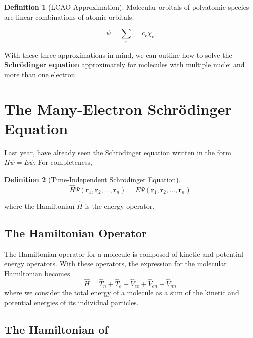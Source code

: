 \documentclass[a4paper]{tufte-handout}
\theoremstyle{definition}
\newtheorem{definition}{Definition}
\begin{document}
\begin{definition}[LCAO Approximation] 
  Molecular orbitals of polyatomic species are linear combinations of atomic orbitals.

  \begin{equation}
    \psi = \sum_{r} = c_{r} \chi_{r}
  \end{equation}

\end{definition}

With these three approximations in mind, we can outline how to solve the \textbf{Schrödinger equation}
approximately for molecules with multiple nuclei and more than one electron.

\section{The Many-Electron Schrödinger Equation}

Last year, have already seen the Schrödinger equation written in the form $H\psi = E\psi$. For completeness,

\begin{definition}[Time-Independent Schrödinger Equation] 

  \begin{equation}
    \hat{H} \Psi(\mathbf{r}_1, \mathbf{r}_2, \dots, \mathbf{r}_n) = E \Psi(\mathbf{r}_1, \mathbf{r}_2, \dots, \mathbf{r}_n)
  \end{equation}

  where the Hamiltonian $\hat{H}$ is the energy operator.

\end{definition}

\subsection{The Hamiltonian Operator}

The Hamiltonian operator for a molecule is composed of kinetic and potential energy operators. 
With these operators, the expression for the molecular Hamiltonian becomes 
$$\hat{H} = \hat{T}_{n} + \hat{T}_{e} + \hat{V}_{ee} + \hat{V}_{en} + \hat{V}_{nn}$$
where we consider the total energy of a molecule as a sum of the kinetic and potential energies of its individual particles.

\subsection{The Hamiltonian of }
\end{document}
